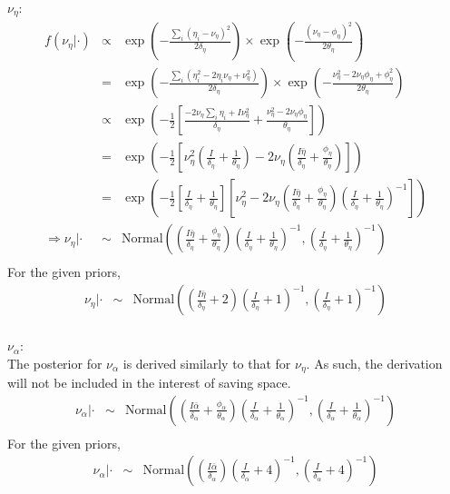 $\nu_{\eta}$:\\
\begin{eqnarray*}
f(\nu_{\eta}|\cdot)&\propto&\exp\left(-\frac{\sum_i(\eta_i-\nu_{\eta})^2}{2\delta_{\eta}}\right)\times\exp\left(-\frac{(\nu_{\eta}-\phi_{\eta})^2}{2\theta_{\eta}}\right)\\
&=&\exp\left(-\frac{\sum_i(\eta_i^2-2\eta_i\nu_{\eta}+\nu_{\eta}^2)}{2\delta_{\eta}}\right)\times\exp\left(-\frac{\nu_{\eta}^2-2\nu_{\eta}\phi_{\eta}+\phi_{\eta}^2}{2\theta_{\eta}}\right)\\
&\propto&\exp\left(-\frac{1}{2}\left[\frac{-2\nu_{\eta}\sum_i\eta_i+I\nu_{\eta}^2}{\delta_{\eta}}+\frac{\nu_{\eta}^2-2\nu_{\eta}\phi_{\eta}}{\theta_{\eta}}\right]\right)\\
&=&\exp\left(-\frac{1}{2}\left[\nu_{\eta}^2\left(\frac{I}{\delta_{\eta}}+\frac{1}{\theta_{\eta}}\right)-2\nu_{\eta}\left(\frac{I\bar{\eta}}{\delta_{\eta}}+\frac{\phi_{\eta}}{\theta_{\eta}}\right)\right]\right)\\
&=&\exp\left(-\frac{1}{2}\left[\frac{I}{\delta_{\eta}}+\frac{1}{\theta_{\eta}}\right]\left[\nu_{\eta}^2-2\nu_{\eta}\left(\frac{I\bar{\eta}}{\delta_{\eta}}+\frac{\phi_{\eta}}{\theta_{\eta}}\right)\left(\frac{I}{\delta_{\eta}}+\frac{1}{\theta_{\eta}}\right)^{-1}\right]\right)\\
\Rightarrow \nu_{\eta}|\cdot&\sim&\mbox{Normal}\left(\left(\frac{I\bar{\eta}}{\delta_{\eta}}+\frac{\phi_{\eta}}{\theta_{\eta}}\right)\left(\frac{I}{\delta_{\eta}}+\frac{1}{\theta_{\eta}}\right)^{-1},\left(\frac{I}{\delta_{\eta}}+\frac{1}{\theta_{\eta}}\right)^{-1}\right)\\
\end{eqnarray*}
For the given priors,
\begin{eqnarray*}
\nu_{\eta}|\cdot &\sim& \mbox{Normal}\left(\left(\frac{I\bar{\eta}}{\delta_{\eta}}+2\right)\left(\frac{I}{\delta_{\eta}}+1\right)^{-1},\left(\frac{I}{\delta_{\eta}}+1\right)^{-1}\right)\\
\end{eqnarray*}

$\nu_{\alpha}$:\\
The posterior for $\nu_{\alpha}$ is derived similarly to that for
$\nu_{\eta}$.  As such, the derivation will not be included in the
interest of saving space.
\begin{eqnarray*}
\nu_{\alpha}|\cdot&\sim&\mbox{Normal}\left(\left(\frac{I\bar{\alpha}}{\delta_{\alpha}}+\frac{\phi_{\alpha}}{\theta_{\alpha}}\right)\left(\frac{I}{\delta_{\alpha}}+\frac{1}{\theta_{\alpha}}\right)^{-1},\left(\frac{I}{\delta_{\alpha}}+\frac{1}{\theta_{\alpha}}\right)^{-1}\right)\\
\end{eqnarray*}
For the given priors,
\begin{eqnarray*}
\nu_{\alpha}|\cdot&\sim&\mbox{Normal}\left(\left(\frac{I\bar{\alpha}}{\delta_{\alpha}}\right)\left(\frac{I}{\delta_{\alpha}}+4\right)^{-1},\left(\frac{I}{\delta_{\alpha}}+4\right)^{-1}\right)\\
\end{eqnarray*}

